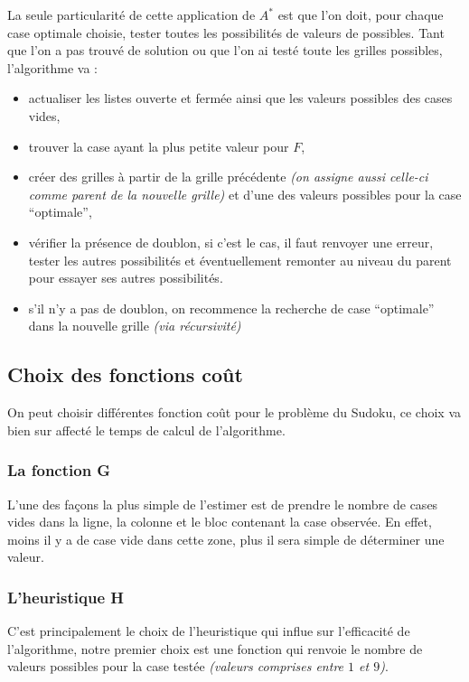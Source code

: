 La seule particularité de cette application de $A^*$ est que l'on doit, pour chaque case optimale choisie, tester toutes les possibilités de valeurs de possibles. Tant que l'on a pas trouvé de solution ou que l'on ai testé toute les grilles possibles, l'algorithme va :
\begin{itemize}
\item  actualiser les listes ouverte et fermée ainsi que les valeurs possibles des cases vides,
\item trouver la case ayant la plus petite valeur pour $F$,
\item créer des grilles à partir de la grille précédente \textit{(on assigne aussi celle-ci comme parent de la nouvelle grille)} et d'une des valeurs possibles pour la case ``optimale'',
\item vérifier la présence de doublon, si c'est le cas, il faut renvoyer une erreur, tester les autres possibilités et éventuellement remonter au niveau du parent pour essayer ses autres possibilités.
\item s'il n'y a pas de doublon, on recommence la recherche de case ``optimale'' dans la nouvelle grille \textit{(via récursivité)}

\end{itemize}



\subsection{Choix des fonctions coût}

On peut choisir différentes fonction coût pour le problème du Sudoku, ce choix va bien sur affecté le temps de calcul de l'algorithme.

\subsubsection*{La fonction G}

L'une des façons la plus simple de l'estimer est de prendre le nombre de cases vides dans la ligne, la colonne et le bloc contenant la case observée. En effet, moins il y a de case vide dans cette zone, plus il sera simple de déterminer une valeur.


\subsubsection*{L'heuristique H}

C'est principalement le choix de l'heuristique qui influe sur l'efficacité de l'algorithme, notre premier choix est une fonction qui renvoie le nombre de valeurs possibles pour la case testée \textit{(valeurs comprises entre $1$ et $9$)}.

